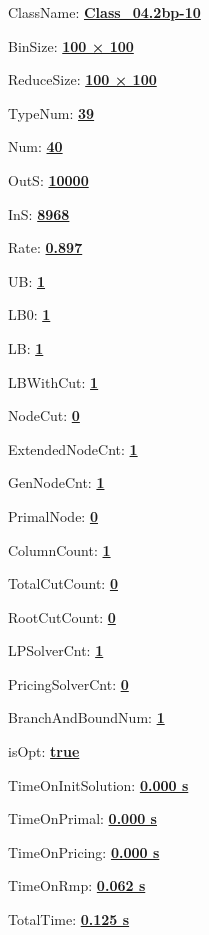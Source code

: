 \documentclass[11pt]{article}
\begin{document}
\pagestyle{empty}


ClassName: \underline{\textbf{Class_04.2bp-10}}
\par
BinSize: \underline{\textbf{100 × 100}}
\par
ReduceSize: \underline{\textbf{100 × 100}}
\par
TypeNum: \underline{\textbf{39}}
\par
Num: \underline{\textbf{40}}
\par
OutS: \underline{\textbf{10000}}
\par
InS: \underline{\textbf{8968}}
\par
Rate: \underline{\textbf{0.897}}
\par
UB: \underline{\textbf{1}}
\par
LB0: \underline{\textbf{1}}
\par
LB: \underline{\textbf{1}}
\par
LBWithCut: \underline{\textbf{1}}
\par
NodeCut: \underline{\textbf{0}}
\par
ExtendedNodeCnt: \underline{\textbf{1}}
\par
GenNodeCnt: \underline{\textbf{1}}
\par
PrimalNode: \underline{\textbf{0}}
\par
ColumnCount: \underline{\textbf{1}}
\par
TotalCutCount: \underline{\textbf{0}}
\par
RootCutCount: \underline{\textbf{0}}
\par
LPSolverCnt: \underline{\textbf{1}}
\par
PricingSolverCnt: \underline{\textbf{0}}
\par
BranchAndBoundNum: \underline{\textbf{1}}
\par
isOpt: \underline{\textbf{true}}
\par
TimeOnInitSolution: \underline{\textbf{0.000 s}}
\par
TimeOnPrimal: \underline{\textbf{0.000 s}}
\par
TimeOnPricing: \underline{\textbf{0.000 s}}
\par
TimeOnRmp: \underline{\textbf{0.062 s}}
\par
TotalTime: \underline{\textbf{0.125 s}}
\par
\newpage
\end{document}
